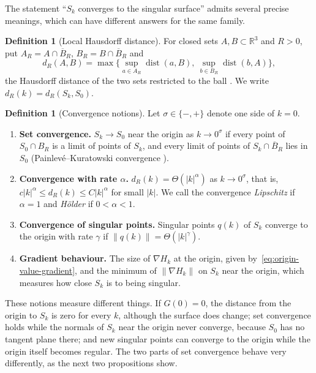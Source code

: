 \documentclass[12pt, a4paper, oneside]{book}
\theoremstyle{plain}
\theoremstyle{definition}
\newtheorem{definition}[theorem]{Definition}
\theoremstyle{remark}
\begin{document}
The statement ``$S_k$ converges to the singular surface'' admits several
precise meanings, which can have different answers for the same family.

\begin{definition}[Local Hausdorff distance]
\label{def:local-hausdorff}
For closed sets $A,B\subset\mathbb{R}^3$ and $R>0$, put $A_R=A\cap\overline{B}_R$,
$B_R=B\cap\overline{B}_R$ and
\[
d_R(A,B)=\max\Big\{\sup_{a\in A_R}\operatorname{dist}(a,B),\ \sup_{b\in B_R}\operatorname{dist}(b,A)\Big\},
\]
the Hausdorff distance of the two sets restricted to the ball
\cite{rockafellar1998variational}. We write $d_R(k)=d_R(S_k,S_0)$.
\end{definition}

\begin{definition}[Convergence notions]
\label{def:convergence-types}
Let $\sigma\in\{-,+\}$ denote one side of $k=0$.
\begin{enumerate}
    \item \textbf{Set convergence.} $S_k\to S_0$ near the origin as
          $k\to0^\sigma$ if every point of $S_0\cap B_R$ is a limit of points
          of $S_k$, and every limit of points of $S_k\cap \overline{B}_R$ lies
          in $S_0$ (Painlevé--Kuratowski convergence
          \cite{rockafellar1998variational}).
    \item \textbf{Convergence with rate $\alpha$.} $d_R(k)=\Theta(|k|^\alpha)$
          as $k\to0^\sigma$, that is,
          $c|k|^\alpha\le d_R(k)\le C|k|^\alpha$ for small $|k|$. We call the
          convergence \emph{Lipschitz} if $\alpha=1$ and \emph{Hölder} if
          $0<\alpha<1$.
    \item \textbf{Convergence of singular points.} Singular points $q(k)$ of
          $S_k$ converge to the origin with rate $\gamma$ if
          $\|q(k)\|=\Theta(|k|^\gamma)$.
    \item \textbf{Gradient behaviour.} The size of $\nabla H_k$ at the origin,
          given by~\eqref{eq:origin-value-gradient}, and the minimum of
          $\|\nabla H_k\|$ on $S_k$ near the origin, which measures how close
          $S_k$ is to being singular.
\end{enumerate}
\end{definition}

These notions measure different things. If $G(0)=0$, the distance from the
origin to $S_k$ is zero for every $k$, although the surface does change; set
convergence holds while the normals of $S_k$ near the origin never converge,
because $S_0$ has no tangent plane there; and new singular points can converge
to the origin while the origin itself becomes regular. The two parts of set
convergence behave very differently, as the next two propositions show.
\end{document}
